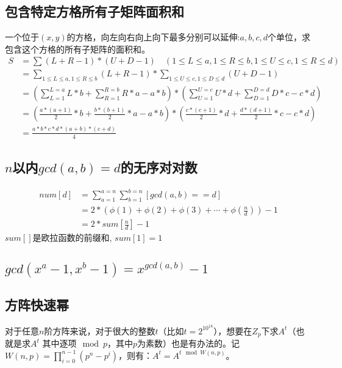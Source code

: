 \subsection{包含特定方格所有子矩阵面积和}
一个位于$(x,y)$的方格，向左向右向上向下最多分别可以延伸:$a,b,c,d$个单位，求包含这个方格的所有子矩阵的面积和。 \\
\begin{equation}
\begin{split}
S &= \sum{}{}(L+R-1) * (U+D-1)\quad (1\leq L\leq a,1\leq R \leq b,1\leq U\leq c,1\leq R\leq d) \\
&= \sum_{1\leq L\leq a,1\leq R \leq b}^{}(L+R-1) *  \sum_{1\leq U\leq c,1\leq D \leq d}^{}(U+D-1) \\
&= (\sum_{L=1}^{L=a}L*b+\sum_{R=1}^{R=b}R * a - a * b)*(\sum_{U=1}^{U=c}U*d+\sum_{D=1}^{D = d}D * c - c * d) \\
&= (\frac{a*(a+1)}{2}*b+\frac{b*(b+1)}{2}*a-a*b)*(\frac{c*(c+1)}{2}*d+\frac{d*(d+1)}{2}*c-c*d)\\
&= \frac{a*b*c*d*(a+b)*(c+d)}{4}
\end{split}
\end{equation}

\subsection{$n$以内$gcd(a,b)=d$的无序对对数}

\begin{equation}
\begin{split}
num[d] &= \sum_{a=1}^{a=n}\sum_{b=1}^{b=n}[gcd(a,b)==d]  \\
&= 2*(\phi(1)+\phi(2)+\phi(3)+\cdots+\phi(\frac{n}{d}))-1 \\
&= 2 * sum[\frac{n}{d}]-1
\end{split}
\end{equation}
$sum[]$是欧拉函数的前缀和, $sum[1]=1$
\subsection{$gcd({x}^{a}-1,{x}^{b}-1)=x^{gcd(a,b)}-1$}
\subsection{方阵快速幂}
对于任意$n$阶方阵来说，对于很大的整数$t$（比如$t=2^{10^{18}}$），想要在$Z_p$下求$A^t$（也就是求$A^t$ 其中逐项$\mod p$，其中$p$为素数）也是有办法的。记$W(n,p)=\prod_{i=0}^{n-1}(p^{n}-p^{i})$，则有：$A^t=A^{t\mod W(n,p)}$。 \\

